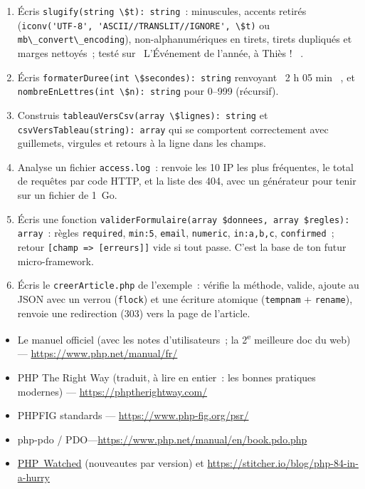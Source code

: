 \documentclass[12pt,a4paper,twoside,openright]{book}
\newcommand{\link}[2]{\href{#2}{#1}}
\begin{document}
\begin{exercice}
\begin{enumerate}
  \item \'Ecris \verb|slugify(string \$t): string|~: minuscules, accents retir\'es
        (\verb|iconv('UTF-8', 'ASCII//TRANSLIT//IGNORE', \$t)| ou \verb|mb\_convert\_encoding|),
        non-alphanum\'eriques en tirets, tirets dupliqu\'es et marges nettoy\'es~; test\'e sur
        \og ~L'\'Ev\'enement de l'ann\'ee, \`a Thi\`es !~ \fg{}.
  \item \'Ecris \verb|formaterDuree(int \$secondes): string| renvoyant \og ~2 h 05 min~ \fg{}, et
        \verb|nombreEnLettres(int \$n): string| pour 0--999 (r\'ecursif).
  \item Construis \verb|tableauVersCsv(array \$lignes): string| et \verb|csvVersTableau(string): array|
        qui se comportent correctement avec guillemets, virgules et retours \`a la ligne dans les champs.
  \item Analyse un fichier \verb|access.log|~: renvoie les 10 IP les plus fr\'equentes, le total de
        requ\^etes par code HTTP, et la liste des 404, avec un g\'en\'erateur pour tenir sur un fichier
        de 1~Go.
  \item \'Ecris une fonction \verb|validerFormulaire(array $donnees, array $regles): array|~: r\`egles
        \verb|required|, \verb|min:5|, \verb|email|, \verb|numeric|, \verb|in:a,b,c|,
        \verb|confirmed|~; retour \verb|[champ => [erreurs]]| vide si tout passe. C'est la base
        de ton futur micro-framework.
  \item \'Ecris le \verb|creerArticle.php| de l'exemple~: v\'erifie la m\'ethode, valide, ajoute au JSON
        avec un verrou (\verb|flock|) et une \'ecriture atomique (\verb|tempnam| + \verb|rename|),
        renvoie une redirection (303) vers la page de l'article.
\end{enumerate}
\end{exercice}

\begin{ressources}
\begin{itemize}
  \item Le manuel officiel (avec les notes d'utilisateurs~; la 2\textsuperscript{e} meilleure doc du web) --- \url{https://www.php.net/manual/fr/}
  \item PHP The Right Way (traduit, \`a lire en entier~: les bonnes pratiques modernes) --- \url{https://phptherightway.com/}
  \item PHPFIG standards --- \url{https://www.php-fig.org/psr/}
  \item php-pdo / PDO---\url{https://www.php.net/manual/en/book.pdo.php}
  \item \link{PHP~Watched}{https://php.watch/} (nouveautes par version) et \url{https://stitcher.io/blog/php-84-in-a-hurry}
\end{itemize}
\end{ressources}
\end{document}
